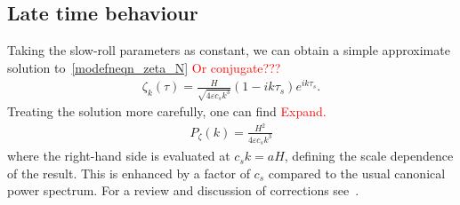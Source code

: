     \subsection{Late time behaviour}




    Taking the slow-roll parameters as constant, we can obtain a simple approximate solution
    to~\eqref{modefneqn_zeta_N}
    \textcolor{red}{Or conjugate???}
    \begin{align}\label{uk_solution}
        \zeta_k(\tau) = \frac{H}{\sqrt{4\varepsilon c_s k^3}}\left(1-ik\tau_s\right)e^{i k\tau_s}.
    \end{align}
    Treating the solution more carefully, one can find
    \textcolor{red}{Expand.}
    \begin{align}
        P_\zeta(k) = \frac{H^2}{4\varepsilon c_s k^3}
    \end{align}
    where the right-hand side is evaluated at $c_sk=aH$,
    defining the scale dependence of the result.
    This is enhanced by a factor of $c_s$ compared to the
    usual canonical power spectrum.
    For a review and discussion of corrections see~\cite{px_burrage}.


